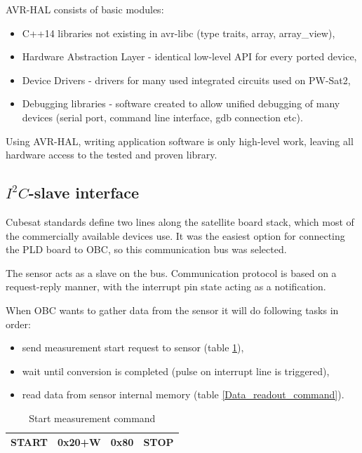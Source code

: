     AVR-HAL consists of basic modules:
    \begin{itemize}
        \item C++14 libraries not existing in avr-libc (type traits, array, array\_view),
        \item Hardware Abstraction Layer - identical low-level API for every ported device,
        \item Device Drivers - drivers for many used integrated circuits used on PW-Sat2,
        \item Debugging libraries - software created to allow unified debugging of many devices (serial port, command line interface, gdb connection etc).
    \end{itemize}

    Using AVR-HAL, writing application software is only high-level work, leaving all hardware access to the tested and proven library.

    \subsection{$I^2C$-slave interface}
    Cubesat standards define two \iic lines along the satellite board stack, which most of the commercially available devices use. It was the easiest option for connecting the PLD board to OBC, so this communication bus was selected.

    The sensor acts as a slave on the \iic bus. Communication protocol is based on a request-reply manner, with the interrupt pin state acting as a notification.

    When OBC wants to gather data from the sensor it will do following tasks in order:
    \begin{itemize}
        \item send measurement start request to sensor (table \ref{Start_measurement_command}),
        \item wait until conversion is completed (pulse on interrupt line is triggered),
        \item read data from sensor internal memory (table \ref{Data_readout_command}).
    \end{itemize}

    \begin{table}[H]
        \begin{center}
            \begin{tabular}{|c|c|c|c|}
                \hline
                START & 0x20+W & 0x80 & STOP \\ \hline
            \end{tabular}
        \end{center}
        \caption{Start measurement command}
        \label{Start_measurement_command}
    \end{table}

